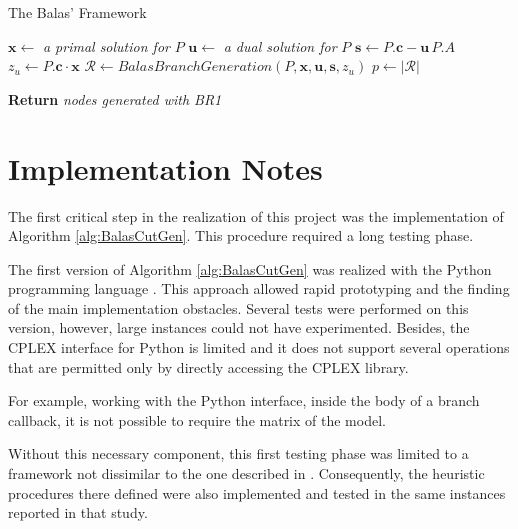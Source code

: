 \documentclass[a4paper,12pt]{mydeitesi_eng}
\begin{document}
\begin{chapter}{The Balas' Framework}
\begin{algorithm}[h]

\BlankLine

$\mathbf{x} \gets $ \emph{a primal solution for} $P$\;
$\mathbf{u} \gets $ \emph{a dual solution for} $P$\;
$\mathbf{s} \gets P.\mathbf{c} - \mathbf{u} \, P.A$\;
$z_u \gets P.\mathbf{c \cdot x}$\;
$\mathcal{R} \gets BalasBranchGeneration(P, \mathbf{x}, \mathbf{u}, \mathbf{s}, z_u)$\;
$p \gets \left| \mathcal{R} \right|$\;

{
	\textbf{Return} \emph{nodes generated with BR1}\;
} 

\BlankLine
\BlankLine

\caption{The complete branch procedure.}
\label{alg:CompleteBrancProc}
\end{algorithm}


\section{Implementation Notes}
\label{sec:ImplementationNotes}


The first critical step in the realization of this project was the implementation of Algorithm \ref{alg:BalasCutGen}.
This procedure required a long testing phase.

The first version of Algorithm \ref{alg:BalasCutGen} was realized with the Python programming language \cite{Python}.
This approach allowed rapid prototyping and the finding of the main implementation obstacles.
Several tests were performed on this version, however, large instances could not have experimented.
Besides, the CPLEX interface for Python is limited and it does not support several operations that are permitted only by directly accessing the CPLEX library.

For example, working with the Python interface, inside the body of a branch callback, it is not possible to require the matrix of the model.

Without this necessary component, this first testing phase was limited to a framework not dissimilar to the one described in \cite{Balas1980-Computational}.
Consequently, the heuristic procedures there defined were also implemented and tested in the same instances reported in that study.\\


\end{chapter}
\end{document}
